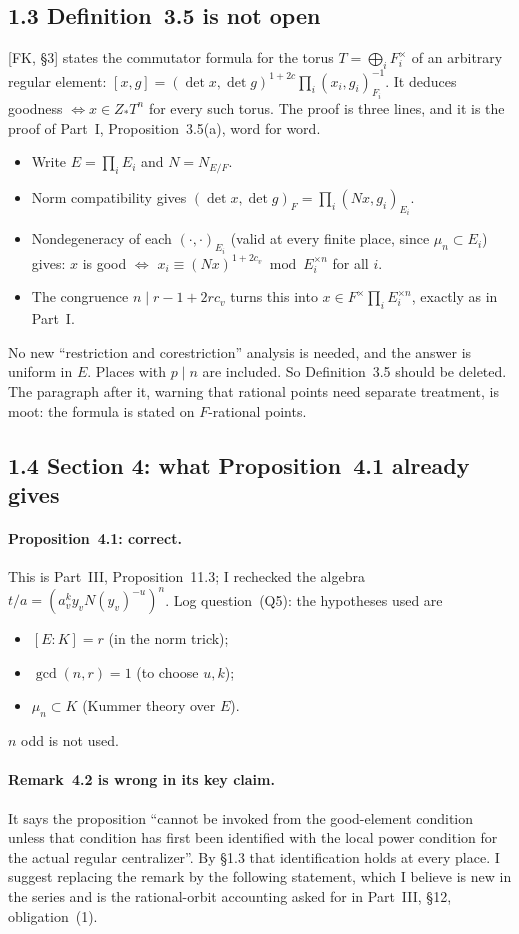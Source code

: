 \documentclass[11pt]{article}
\theoremstyle{definition}
\begin{document}
\subsection*{1.3 Definition~3.5 is not open}
[FK, \S3] states the commutator formula for the torus
$T=\bigoplus_iF_i^\times$ of an arbitrary regular element:
$[x,g]=(\det x,\det g)^{1+2c}\prod_i(x_i,g_i)_{F_i}^{-1}$. It deduces
goodness $\iff x\in Z_*T^n$ for every such torus. The proof is three
lines, and it is the proof of Part~I, Proposition~3.5(a), word for word.
\begin{itemize}
\item Write $E=\prod_iE_i$ and $N=N_{E/F}$.
\item Norm compatibility gives
$(\det x,\det g)_F=\prod_i(Nx,g_i)_{E_i}$.
\item Nondegeneracy of each $(\cdot,\cdot)_{E_i}$ (valid at every finite
place, since $\mu_n\subset E_i$) gives: $x$ is good $\iff$
$x_i\equiv(Nx)^{1+2c_v}\bmod E_i^{\times n}$ for all $i$.
\item The congruence $n\mid r-1+2rc_v$ turns this into
$x\in F^\times\prod_iE_i^{\times n}$, exactly as in Part~I.
\end{itemize}
No new ``restriction and corestriction'' analysis is needed, and the
answer is uniform in $E$. Places with $p\mid n$ are included. So
Definition~3.5 should be deleted. The paragraph after it, warning that
rational points need separate treatment, is moot: the formula is stated
on $F$-rational points.

\subsection*{1.4 Section 4: what Proposition~4.1 already gives}
\paragraph{Proposition~4.1: correct.} This is Part~III, Proposition~11.3;
I rechecked the algebra
$t/a=(a_v^k y_vN(y_v)^{-u})^n$. Log question~(Q5): the hypotheses used
are
\begin{itemize}
\item $[E:K]=r$ (in the norm trick);
\item $\gcd(n,r)=1$ (to choose $u,k$);
\item $\mu_n\subset K$ (Kummer theory over $E$).
\end{itemize}
$n$ odd is not used.

\paragraph{Remark~4.2 is wrong in its key claim.} It says the
proposition ``cannot be invoked from the good-element condition unless
that condition has first been identified with the local power condition
for the actual regular centralizer''. By \S1.3 that identification holds
at every place. I suggest replacing the remark by the following
statement, which I believe is new in the series and is the rational-orbit
accounting asked for in Part~III, \S12, obligation~(1).
\end{document}
